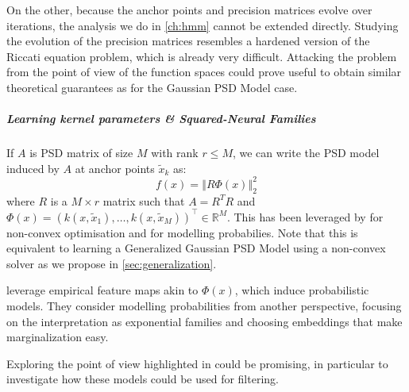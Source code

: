 On the other, because the anchor points and precision matrices evolve over iterations, the analysis we do in \cref{ch:hmm} cannot be extended directly. Studying the evolution of the precision matrices resembles a hardened version of the Riccati equation problem, which is already very difficult. Attacking the problem from the point of view of the function spaces could prove useful to obtain similar theoretical guarantees as for the Gaussian PSD Model case.

\subparagraph{Learning kernel parameters \& Squared-Neural Families} If $A$ is PSD matrix of size $M$ with rank $r \leq M$, we can write the PSD model induced by $A$ at anchor points $\tilde x_k$ as:
\begin{equation}
    f(x) = \left\Vert R\Phi(x)\right\Vert_2^2
\end{equation}
where $R$ is a $M \times r$ matrix such that $A = R^T R$ and $\Phi(x) = (k(x, \tilde x_1), \ldots, k(x, \tilde x_M))^\top\in\mathbb R^M$. This has been leveraged by \cite{beugnot-optim} for non-convex optimisation and \cite{squared-neural-families} for modelling probabilies. Note that this is equivalent to learning a Generalized Gaussian PSD Model using a non-convex solver as we propose in \cref{sec:generalization}.

\cite{squared-neural-families} leverage empirical feature maps akin to $\Phi(x)$, which induce probabilistic models. They consider modelling probabilities from another perspective, focusing on the interpretation as exponential families and choosing embeddings that make marginalization easy.

Exploring the point of view highlighted in \cite{squared-neural-families} could be promising, in particular to investigate how these models could be used for filtering.
